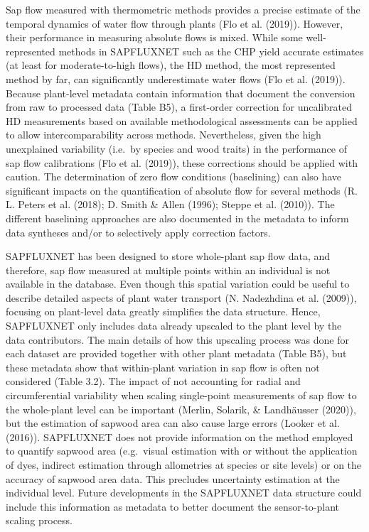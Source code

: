 \documentclass[11pt,twoside]{reedthesis}
\begin{document}
Sap flow measured with thermometric methods provides a precise estimate
of the temporal dynamics of water flow through plants (Flo et al.
(2019)). However, their performance in measuring absolute flows is
mixed. While some well-represented methods in SAPFLUXNET such as the CHP
yield accurate estimates (at least for moderate-to-high flows), the HD
method, the most represented method by far, can significantly
underestimate water flows (Flo et al. (2019)). Because plant-level
metadata contain information that document the conversion from raw to
processed data (Table B5), a first-order correction for uncalibrated HD
measurements based on available methodological assessments can be
applied to allow intercomparability across methods. Nevertheless, given
the high unexplained variability (i.e.~by species and wood traits) in
the performance of sap flow calibrations (Flo et al. (2019)), these
corrections should be applied with caution. The determination of zero
flow conditions (baselining) can also have significant impacts on the
quantification of absolute flow for several methods (R. L. Peters et al.
(2018); D. Smith \& Allen (1996); Steppe et al. (2010)). The different
baselining approaches are also documented in the metadata to inform data
syntheses and/or to selectively apply correction factors.\par

SAPFLUXNET has been designed to store whole-plant sap flow data, and
therefore, sap flow measured at multiple points within an individual is
not available in the database. Even though this spatial variation could
be useful to describe detailed aspects of plant water transport (N.
Nadezhdina et al. (2009)), focusing on plant-level data greatly
simplifies the data structure. Hence, SAPFLUXNET only includes data
already upscaled to the plant level by the data contributors. The main
details of how this upscaling process was done for each dataset are
provided together with other plant metadata (Table B5), but these
metadata show that within-plant variation in sap flow is often not
considered (Table 3.2). The impact of not accounting for radial and
circumferential variability when scaling single-point measurements of
sap flow to the whole-plant level can be important (Merlin, Solarik, \&
Landhäusser (2020)), but the estimation of sapwood area can also cause
large errors (Looker et al. (2016)). SAPFLUXNET does not provide
information on the method employed to quantify sapwood area (e.g.~visual
estimation with or without the application of dyes, indirect estimation
through allometries at species or site levels) or on the accuracy of
sapwood area data. This precludes uncertainty estimation at the
individual level. Future developments in the SAPFLUXNET data structure
could include this information as metadata to better document the
sensor-to-plant scaling process.\par
\end{document}
